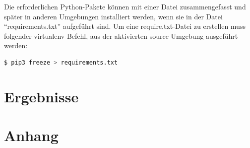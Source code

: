 \documentclass[
        ngerman,
        paper=a4,
        numbers=noendperiod,
]{scrreprt}
\begin{document}
Die erforderlichen Python-Pakete können mit einer Datei zusammengefasst und später in anderen Umgebungen installiert werden, wenn sie in der Datei \enquote{requirements.txt} aufgeführt sind. Um eine require.txt-Datei zu erstellen muss folgender virtualenv Befehl, aus der aktivierten source Umgebung ausgeführt werden:

\begin{lstlisting}[language=bash, caption=Erstellen der requirements.txt Datei]
$ pip3 freeze > requirements.txt
\end{lstlisting}





\chapter{Ergebnisse}










%








































\appendix 
\chapter{Anhang}
\label{chapter:Anhang}%


\clearpage
        
        
        
\end{document}
